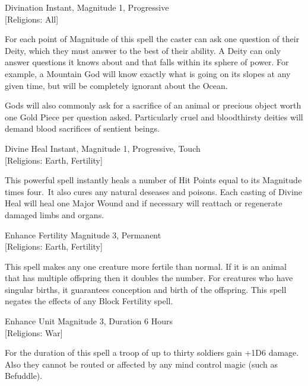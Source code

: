 \begin{rpg-spell}
{Divination}
{Instant, Magnitude 1, Progressive\\{[Religions: All]}}

For each point of Magnitude of this spell the caster can ask one question of their Deity, which they must answer to the best of their ability. A Deity can only answer questions it knows about and that falls within its sphere of power. For example, a Mountain God will know exactly what is going on its slopes at any given time, but will be completely ignorant about the Ocean.

Gods will also commonly ask for a sacrifice of an animal or precious object worth one Gold Piece per question asked. Particularly cruel and bloodthirsty deities will demand blood sacrifices of sentient beings.
\end{rpg-spell}

\begin{rpg-spell}
{Divine Heal}
{Instant, Magnitude 1, Progressive, Touch\\{[Religions: Earth, Fertility]}}

This powerful spell instantly heals a number of Hit Points equal to its Magnitude times four. It also cures any natural deseases and poisons. Each casting of Divine Heal will heal one Major Wound and if necessary will reattach or regenerate damaged limbs and organs.  
\end{rpg-spell}

\begin{rpg-spell}
{Enhance Fertility}
{Magnitude 3, Permanent\\{[Religions: Earth, Fertility]}}

This spell makes any one creature more fertile than normal. If it is an animal that has multiple offspring then it doubles the number. For creatures who have singular births, it guarantees conception and birth of the offspring. This spell negates the effects of any Block Fertility spell. 
\end{rpg-spell}

\begin{rpg-spell}
{Enhance Unit}
{Magnitude 3, Duration 6 Hours\\{[Religions: War]}}

For the duration of this spell a troop of up to thirty soldiers gain +1D6 damage. Also they cannot be routed or affected by any mind control magic (such as Befuddle).
\end{rpg-spell}

